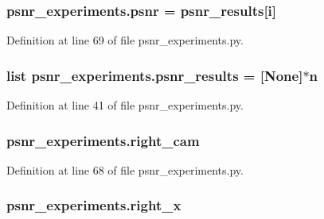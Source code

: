 \subsubsection[{\texorpdfstring{psnr}{psnr}}]{\setlength{\rightskip}{0pt plus 5cm}psnr\+\_\+experiments.\+psnr = {\bf psnr\+\_\+results}\mbox{[}i\mbox{]}}\hypertarget{namespacepsnr__experiments_a6ba2472659fdf21533f42747332314d5}{}\label{namespacepsnr__experiments_a6ba2472659fdf21533f42747332314d5}


Definition at line 69 of file psnr\+\_\+experiments.\+py.

\subsubsection[{\texorpdfstring{psnr\+\_\+results}{psnr_results}}]{\setlength{\rightskip}{0pt plus 5cm}list psnr\+\_\+experiments.\+psnr\+\_\+results = \mbox{[}None\mbox{]}$\ast${\bf n}}\hypertarget{namespacepsnr__experiments_a891f44706ebab018824dda78fa13840d}{}\label{namespacepsnr__experiments_a891f44706ebab018824dda78fa13840d}


Definition at line 41 of file psnr\+\_\+experiments.\+py.

\subsubsection[{\texorpdfstring{right\+\_\+cam}{right_cam}}]{\setlength{\rightskip}{0pt plus 5cm}psnr\+\_\+experiments.\+right\+\_\+cam}\hypertarget{namespacepsnr__experiments_a920b8cd9a2b238288683cc42577e1e78}{}\label{namespacepsnr__experiments_a920b8cd9a2b238288683cc42577e1e78}


Definition at line 68 of file psnr\+\_\+experiments.\+py.

\subsubsection[{\texorpdfstring{right\+\_\+x}{right_x}}]{\setlength{\rightskip}{0pt plus 5cm}psnr\+\_\+experiments.\+right\+\_\+x}\hypertarget{namespacepsnr__experiments_abeb7ea20616f61e643624bf7cfea24c3}{}\label{namespacepsnr__experiments_abeb7ea20616f61e643624bf7cfea24c3}


